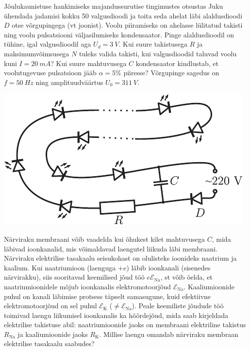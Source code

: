 \documentclass[10pt, twoside]{article}
\begin{document}
{%

Jõulukaunistuse hankimiseks majandussurutise tingimustes otsustas Juku
ühendada jadamisi kokku 50 valgusdioodi ja toita seda ahelat läbi alaldusdioodi $D$ otse
võrgupingega (vt joonist). Voolu piiramiseks on ahelasse lülitatud takisti
ning voolu pulsatsiooni väljasilumiseks kondensaator. Pinge alaldusdioodil on
tühine, igal valgusdioodil aga $U_d=\SI{3}{V}$. Kui suure takistusega $R$ ja maksimumvõimsusega $N$ tuleks valida
takisti, kui valgusdioodid taluvad voolu kuni $I=\SI{20}{mA}$? Kui suure mahtuvusega $C$
kondensaator kindlustab, et voolutugevuse pulsatsioon jääb $\alpha=\num{5}\%$ piiresse? Võrgupinge
sagedus on $f=\SI{50}{Hz}$ ning amplituudväärtus $U_0=\SI{311}{V}$.

\begin{center}
	\includegraphics[scale=0.75]{2010-v3g-08-elektrikuunlad2}
\end{center}
\probend
\bigskip


Närviraku membraani võib vaadelda kui õhukest kilet mahtuvusega $C$, mida läbivad ioonkanalid, mis võimaldavad laengutel liikuda läbi
membraani. Närviraku elektrilise tasakaalu seisukohast on olulisteks ioonideks
naatrium ja kaalium. Kui naatriumioon (laenguga $+e$) läbib ioonkanali (sisenedes närvirakku), siis sooritavad keemilised jõud töö $e\mathcal{E}_{\mathrm{Na}}$, st võib öelda, et
naatriumioonidele mõjub ioonkanalis elektromotoorjõud $\mathcal{E}_{\mathrm{Na}}$. Kaaliumioonide
puhul on kanali läbimise protsess täpselt samasugune, kuid efektiivne elektromotoorjõud on sel puhul $\mathcal{E}_{\mathrm{K}}$ ($\neq \mathcal{E}_{\mathrm{Na}}$). Peale keemiliste jõudude töö toimivad
laengu liikumisel ioonkanalis ka hõõrdejõud, mida saab kirjeldada elektrilise
takistuse abil: naatriumioonide jaoks on membraani elektriline takistus $R_{\mathrm{Na}}$ ja kaaliumioonide jaoks $R_{\mathrm{K}}$. Millise laengu omandab närviraku membraan
elektrilise tasakaalu saabudes?
\probend
\bigskip
\newpage\subsection{\protect{}}

}
\end{document}
